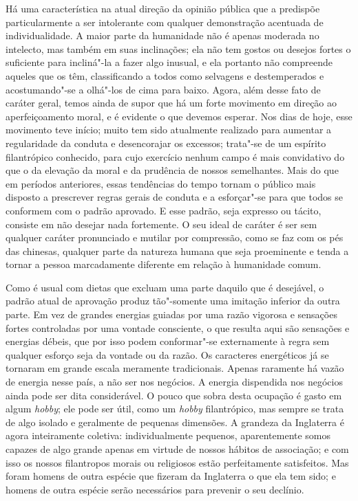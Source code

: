 Há uma característica na atual direção da opinião pública que a
predispõe particularmente a ser intolerante com qualquer demonstração
acentuada de individualidade. A maior parte da humanidade não é apenas
moderada no intelecto, mas também em suas inclinações; ela não tem
gostos ou desejos fortes o suficiente para incliná"-la a fazer algo
inusual, e ela portanto não compreende aqueles que os têm,
classificando a todos como selvagens e destemperados e acostumando"-se
a olhá"-los de cima para baixo. Agora, além desse fato de caráter geral,
temos ainda de supor que há um forte movimento em direção ao
aperfeiçoamento moral, e é evidente o que devemos esperar. Nos dias de hoje,
esse movimento teve início; muito tem sido atualmente realizado para
aumentar a regularidade da conduta e desencorajar os excessos; trata"-se
de um espírito filantrópico conhecido, para cujo exercício nenhum campo
é mais convidativo do que o da elevação da moral e da prudência de
nossos semelhantes. Mais do que em períodos anteriores, essas
tendências do tempo tornam o público mais disposto a prescrever regras
gerais de conduta e a esforçar"-se para que todos se conformem
com o padrão aprovado. E esse padrão, seja expresso ou tácito, consiste
em não desejar nada fortemente. O seu ideal de caráter é ser sem
qualquer caráter pronunciado e mutilar por compressão, como se faz com
os pés das chinesas, qualquer parte da natureza humana que seja
proeminente e tenda a tornar a pessoa marcadamente diferente em relação
à humanidade comum.

Como é usual com dietas que excluam uma parte daquilo que é desejável, o
padrão atual de aprovação produz tão"-somente uma imitação inferior da
outra parte. Em vez de grandes energias guiadas por uma razão vigorosa e
sensações fortes controladas por uma vontade consciente, o que resulta
aqui são sensações e energias débeis, que por isso podem conformar"-se
externamente à regra sem qualquer esforço seja da vontade ou da razão.
Os caracteres energéticos já se tornaram em grande escala meramente
tradicionais. Apenas raramente há vazão de energia nesse país, a não
ser nos negócios. A energia dispendida nos negócios ainda pode ser dita
considerável. O pouco que sobra desta ocupação é gasto em algum
\textit{hobby}; ele pode ser útil, como um \textit{hobby} filantrópico,
mas sempre se trata de algo isolado e geralmente de pequenas dimensões.
A grandeza da Inglaterra é agora inteiramente coletiva: individualmente
pequenos, aparentemente somos capazes de algo grande apenas em virtude
de nossos hábitos de associação; e com isso os nossos filantropos
morais ou religiosos estão perfeitamente satisfeitos. Mas foram homens
de outra espécie que fizeram da Inglaterra o que ela tem sido; e homens
de outra espécie serão necessários para prevenir o seu declínio.

